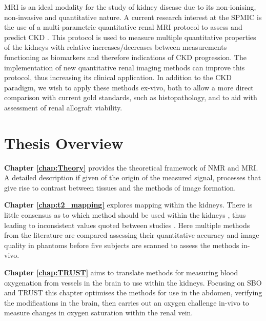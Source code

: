 \ac{MRI} is an ideal modality for the study of kidney disease due to its non-ionising, non-invasive and quantitative nature. A current research interest at the \ac{SPMIC} is the use of a multi-parametric quantitative renal \ac{MRI} protocol to assess and predict \ac{CKD} \cite{cox_multiparametric_2017, buchanan_quantitative_2019}. This protocol is used to measure multiple quantitative properties of the kidneys with relative increases/decreases between measurements functioning as biomarkers and therefore indications of \ac{CKD} progression. The implementation of new quantitative renal imaging methods can improve this protocol, thus increasing its clinical application. In addition to the \ac{CKD} paradigm, we wish to apply these methods ex-vivo, both to allow a more direct comparison with current gold standards, such as histopathology, and to aid with assessment of renal allograft viability.

\newpage

\section{Thesis Overview}
\label{sec:intro_overview}

\textbf{Chapter \ref{chap:Theory}} provides the theoretical framework of \ac{NMR} and \ac{MRI}. A detailed description if given of the origin of the measured signal, processes that give rise to contrast between tissues and the methods of image formation.

\textbf{Chapter \ref{chap:t2_mapping}} explores \ttwo mapping within the kidneys. There is little consensus as to which method should be used within the kidneys \cite{dekkers_consensus-based_2019}, thus leading to inconsistent values quoted between studies \cite{wolf_magnetic_2018}. Here multiple methods from the literature are compared assessing their quantitative accuracy and image quality in phantoms before five subjects are scanned to assess the methods in-vivo.

\textbf{Chapter \ref{chap:TRUST}} aims to translate methods for measuring blood oxygenation from vessels in the brain to use within the kidneys. Focusing on \ac{SBO} \cite{jain_mri_2010} and \ac{TRUST} \cite{lu_quantitative_2008} this chapter optimises the methods for use in the abdomen, verifying the modifications in the brain, then carries out an oxygen challenge in-vivo to measure changes in oxygen saturation within the renal vein.

